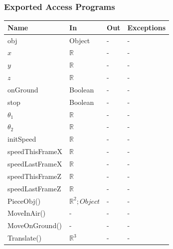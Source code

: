 \documentclass[12pt, titlepage]{article}
\begin{document}
\subsubsection{Exported Access Programs}

\begin{center}
	\begin{tabular}{p{4cm} p{4cm} p{4cm} p{2cm}}
		\hline
		\textbf{Name} & \textbf{In} & \textbf{Out} & \textbf{Exceptions} \\
		\hline		
		obj & Object & - & - \\
		$x$ & $\mathbb{R}$ & - & - \\
		$y$ & $\mathbb{R}$ & - & - \\
		$z$ & $\mathbb{R}$ & - & - \\
		onGround & Boolean & - & - \\
		stop & Boolean & - & - \\
		$\theta_{1}$ & $\mathbb{R}$ & - & - \\
		$\theta_{2}$ & $\mathbb{R}$ & - & - \\
		initSpeed & $\mathbb{R}$ & - & - \\
		speedThisFrameX & $\mathbb{R}$ & - & - \\
		speedLastFrameX & $\mathbb{R}$ & - & - \\
		speedThisFrameZ & $\mathbb{R}$ & - & - \\
		speedLastFrameZ & $\mathbb{R}$ & - & - \\
		PieceObj() & $\mathbb{R}^{2};Object$ & - & - \\
		MoveInAir() & - & - & - \\
		MoveOnGround() & - & - & - \\
		Translate() & $\mathbb{R}^{3}$ & - & - \\
		\hline
	\end{tabular}
\end{center}
\end{document}
